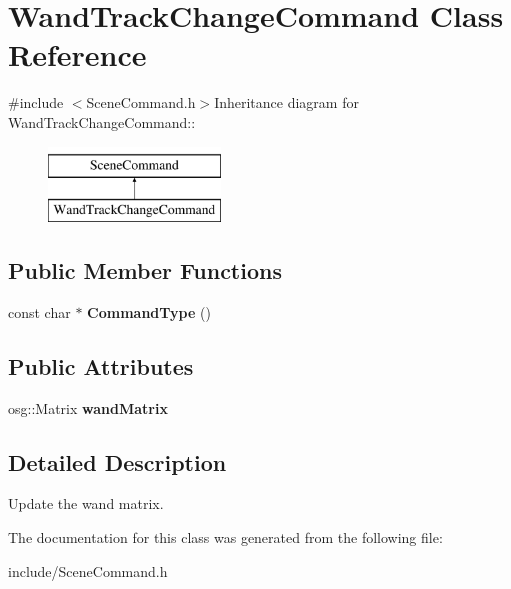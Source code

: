 \hypertarget{class_wand_track_change_command}{
\section{WandTrackChangeCommand Class Reference}
\label{class_wand_track_change_command}
}


{\ttfamily \#include $<$SceneCommand.h$>$}Inheritance diagram for WandTrackChangeCommand::\begin{figure}[H]
\begin{center}
\leavevmode
\includegraphics[height=2cm]{class_wand_track_change_command}
\end{center}
\end{figure}
\subsection*{Public Member Functions}
\begin{DoxyCompactItemize}
\item 
\hypertarget{class_wand_track_change_command_aad4486e267671ee065d2fa94be79bdbb}{
const char $\ast$ {\bfseries CommandType} ()}
\label{class_wand_track_change_command_aad4486e267671ee065d2fa94be79bdbb}

\end{DoxyCompactItemize}
\subsection*{Public Attributes}
\begin{DoxyCompactItemize}
\item 
\hypertarget{class_wand_track_change_command_a86edfe51a306580782ec7c8e7bf990f9}{
osg::Matrix {\bfseries wandMatrix}}
\label{class_wand_track_change_command_a86edfe51a306580782ec7c8e7bf990f9}

\end{DoxyCompactItemize}


\subsection{Detailed Description}
Update the wand matrix. 

The documentation for this class was generated from the following file:\begin{DoxyCompactItemize}
\item 
include/SceneCommand.h\end{DoxyCompactItemize}
